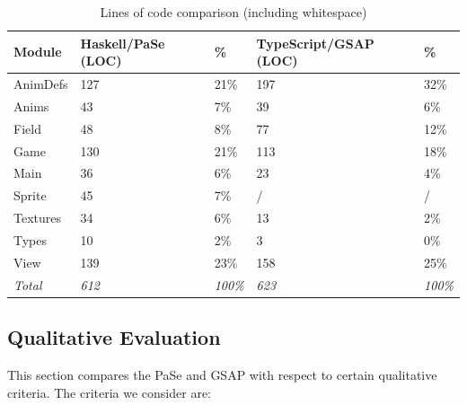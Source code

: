 \begin{table}[t!]
\caption{Lines of code comparison (including whitespace)}
\centering
\label{tbl:loc}
\begin{center}
\begin{tabular}{l@{\hskip 0.5cm}ll@{\hskip 0.2cm}ll}
 Module & Haskell/PaSe (LOC) & \% & TypeScript/GSAP (LOC) & \% \\
 \hline
 AnimDefs & 127 & 21\% & 197 & 32\% \\ 
 Anims & 43 & 7\% & 39 & 6\% \\  
 Field & 48 & 8\% & 77 & 12\% \\  
 Game & 130 & 21\% & 113 & 18\% \\  
 Main & 36 & 6\% & 23 & 4\% \\  
 Sprite & 45 & 7\% & / & / \\  
 Textures & 34 & 6\% & 13 & 2\% \\  
 Types & 10 & 2\% & 3 & 0\% \\  
 View & 139 & 23\% & 158 & 25\% \\
 \emph{Total} & \emph{612} & \emph{100\%} & \emph{623} & \emph{100\%}
\end{tabular}
\end{center}
\end{table}

\subsection{Qualitative Evaluation}

This section compares the PaSe and GSAP with respect to certain qualitative criteria. The criteria we consider are:

